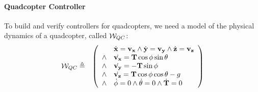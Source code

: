 \paragraph{Quadcopter Controller}
\label{sec:quadcopter-dynamics}
To build and verify controllers for quadcopters, we need a model of the
physical dynamics of a quadcopter, called $\mathcal{W}_{QC}$:
\[\begin{array}{rl}
\mathcal{W}_{QC} \triangleq & \left(\begin{array}{ll}
       & \dot{\mathbf{x}} = \mathbf{v_x} \wedge \dot{\mathbf{y}} = \mathbf{v_y} \wedge \dot{\mathbf{z}} = \mathbf{v_z} \\
\wedge & \dot{\mathbf{v_x}} = \mathbf{T} \cos \mathbf{\phi} \sin \mathbf{\theta} \\
\wedge & \dot{\mathbf{v_y}} = -\mathbf{T} \sin \mathbf{\phi} \\
\wedge & \dot{\mathbf{v_z}} = \mathbf{T} \cos \mathbf{\phi} \cos \mathbf{\theta} - g \\
\wedge & \dot{\mathbf{\phi}} = 0 \wedge \dot{\mathbf{\theta}} = 0 \wedge \dot{\mathbf{T}} = 0
\end{array}\right)
\end{array}
\]

